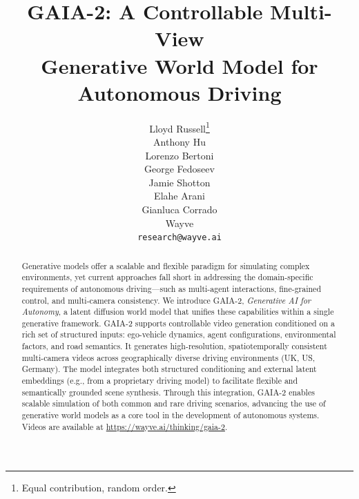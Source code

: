 \documentclass{article}
\title{GAIA-2: A Controllable Multi-View \\ Generative  World Model for Autonomous Driving}
\author{%
  Lloyd Russell\thanks{Equal contribution, random order.}\\
  \And
  Anthony Hu\footnotemark[1]\\
  \And
  Lorenzo Bertoni\footnotemark[1]\\
  \And
  George Fedoseev\footnotemark[1]\\
  \AND
  Jamie Shotton\\
  \And
  Elahe Arani\\
  \And
  Gianluca Corrado\footnotemark[1]\\
  \AND
  Wayve\\
  \texttt{research@wayve.ai}\\
}
\begin{document}
\graphicspath{{Figures/}}

\maketitle


\begin{abstract}
    Generative models offer a scalable and flexible paradigm for simulating complex environments, yet current approaches fall short in addressing the domain-specific requirements of autonomous driving—such as multi-agent interactions, fine-grained control, and multi-camera consistency. We introduce GAIA-2, \textit{Generative AI for Autonomy}, a latent diffusion world model that unifies these capabilities within a single generative framework. GAIA-2 supports controllable video generation conditioned on a rich set of structured inputs: ego-vehicle dynamics, agent configurations, environmental factors, and road semantics. It generates high-resolution, spatiotemporally consistent multi-camera videos across geographically diverse driving environments (UK, US, Germany). The model integrates both structured conditioning and external latent embeddings (e.g., from a proprietary driving model) to facilitate flexible and semantically grounded scene synthesis. Through this integration, GAIA-2 enables scalable simulation of both common and rare driving scenarios, advancing the use of generative world models as a core tool in the development of autonomous systems.
    Videos are available at \url{https://wayve.ai/thinking/gaia-2}.
\end{abstract}














\end{document}
